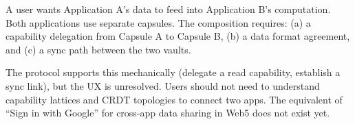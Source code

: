 A user wants Application A's data to feed into Application B's computation.
Both applications use separate capsules. The composition requires: (a) a
capability delegation from Capsule A to Capsule B, (b) a data format
agreement, and (c) a sync path between the two vaults.

The protocol supports this mechanically (delegate a read capability, establish
a sync link), but the UX is unresolved. Users should not need to understand
capability lattices and CRDT topologies to connect two apps. The equivalent
of ``Sign in with Google'' for cross-app data sharing in Web5 does not
exist yet.

